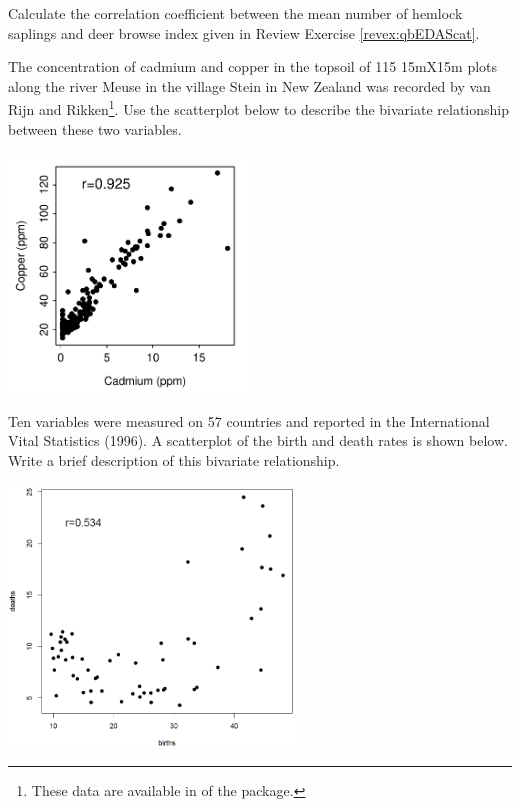 \documentclass[10pt,openany]{book}\usepackage[]{graphicx}\usepackage[]{color}
\begin{document}
\begin{exsection}
  \item \label{revex:qbEDAcorr} \rhw{} Calculate the correlation coefficient between the mean number of hemlock saplings and deer browse index given in Review Exercise \ref{revex:qbEDAScat}. 

  \item \label{revex:qbEDASoil} The concentration of cadmium and copper in the topsoil of 115 15mX15m plots along the river Meuse in the village Stein in New Zealand was recorded by van Rijn and Rikken\footnote{These data are available in  of the  package.}.  Use the scatterplot below to describe the bivariate relationship between these two variables. 

  \begin{center}
    \includegraphics[width=2.5in]{Figs/ScatSoil-1}
  \end{center}

  \item \label{revex:qbEDAVital} Ten variables were measured on 57 countries and reported in the International Vital Statistics (1996).  A scatterplot of the birth and death rates is shown below.  Write a brief description of this bivariate relationship.  
  \begin{center}
    \includegraphics[width=3in]{Figs/ScatVital1.png}
  \end{center}


\end{exsection}
\end{document}
